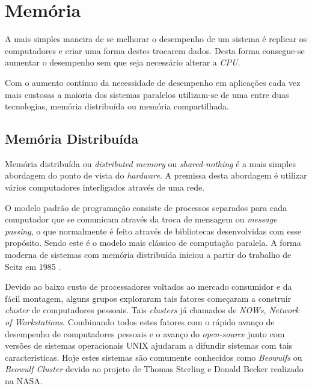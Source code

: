 \chapter{Memória}

A mais simples maneira de se melhorar o desempenho de um sistema é
replicar os computadores e criar uma forma destes trocarem dados.
Desta forma consegue-se aumentar o desempenho sem que seja necessário alterar a
\textit{CPU}.

Com o aumento contínuo da necessidade de desempenho em aplicações cada vez mais
custosas a maioria dos sistemas paralelos utilizam-se de uma entre duas
tecnologias, memória distribuída ou memória compartilhada.


\section{Memória Distribuída}

Memória distribuída ou \textit{distributed memory} ou \textit{shared-nothing} é
a mais simples abordagem do ponto de vista do \textit{hardware}. 
A premissa desta abordagem é utilizar vários computadores interligados através 
de uma rede.

O modelo padrão de programação consiste de processos separados para cada
computador que se comunicam através da troca de mensagem ou 
\textit{message passing}, o que normalmente é feito através de bibliotecas
desenvolvidas com esse propósito. 
Sendo este é o modelo mais clássico de computação paralela. 
A forma moderna de sistemas com memória distribuída iniciou a partir do trabalho 
de Seitz em 1985 \cite{Seitz:1985}.

Devido ao baixo custo de processadores voltados ao mercado consumidor e da fácil
montagem, alguns grupos exploraram tais fatores começaram a construir
\textit{cluster} de computadores pessoais. 
Tais \textit{clusters} já chamados de \textit{NOWs}, 
\textit{Network of Workstations}.
Combinando todos estes fatores com o rápido avanço de desempenho de computadores
pessoais e o avanço do \textit{open-source} junto com  versões de sistemas 
operacionais UNIX ajudaram a difundir sistemas com tais caracteristicas. 
Hoje estes sistemas são comumente conhecidos como \textit{Beowulfs} ou
\textit{Beowulf Cluster} devido ao projeto de Thomas Sterling e Donald Becker
realizado na NASA.

